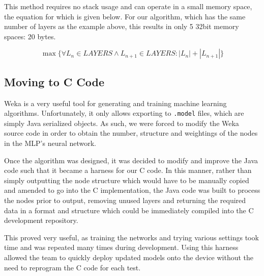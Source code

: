This method requires no stack usage and can operate in a small memory space, the equation for which is given below. For our algorithm, which has the same number of layers as the example above, this results in only 5 32bit memory spaces: 20 bytes.

\begin{equation}
\label{eq:algo-size}
\max\{\forall L_n \in LAYERS \wedge L_{n+1} \in LAYERS : |L_n|+|L_{n+1}|\}
\end{equation}

\subsection{Moving to C Code}

Weka is a very useful tool for generating and training machine learning algorithms. Unfortunately, it only allows exporting to \verb|.model| files, which are simply Java serialized objects. As such, we were forced to modify the Weka source code in order to obtain the number, structure and weightings of the nodes in the MLP's neural network.

Once the algorithm was designed, it was decided to modify and improve the Java code such that it became a harness for our C code. In this manner, rather than simply outputting the node structure which would have to be manually copied and amended to go into the C implementation, the Java code was built to process the nodes prior to output, removing unused layers and returning the required data in a format and structure which could be immediately compiled into the C development repository.

This proved very useful, as training the networks and trying various settings took time and was repeated many times during development. Using this harness allowed the team to quickly deploy updated models onto the device without the need to reprogram the C code for each test.
